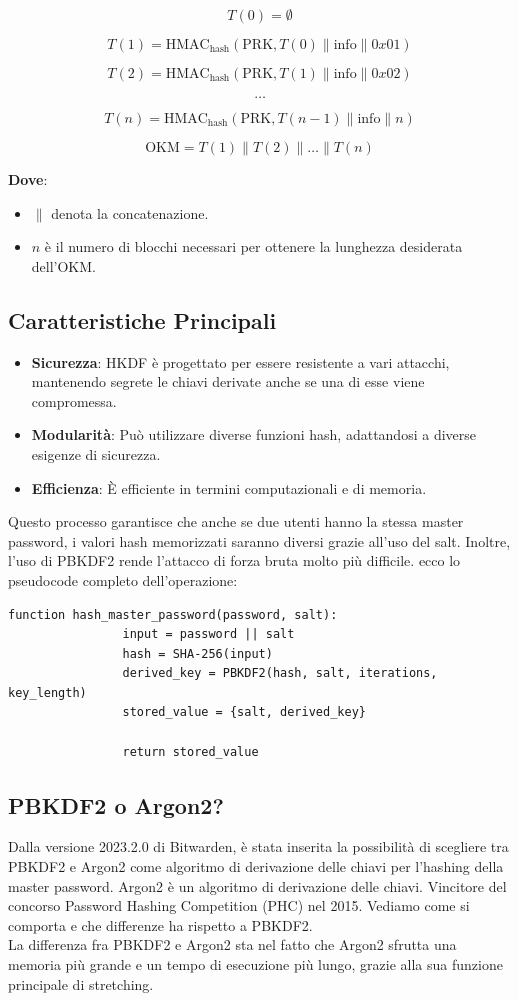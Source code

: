 \documentclass[a4paper,12pt]{report}
\begin{document}
		\[
		T(0) = \emptyset
		\]

		\[
		T(1) = \text{HMAC}_\text{hash}(\text{PRK}, T(0) \| \text{info} \| 0x01)
		\]

		\[
		T(2) = \text{HMAC}_\text{hash}(\text{PRK}, T(1) \| \text{info} \| 0x02)
		\]

		\[
		\ldots
		\]

		\[
		T(n) = \text{HMAC}_\text{hash}(\text{PRK}, T(n-1) \| \text{info} \| n)
		\]

		\[
		\text{OKM} = T(1) \| T(2) \| \ldots \| T(n)
		\]

		\textbf{Dove}:
		\begin{itemize}
			\item \(\| \) denota la concatenazione.
			\item \( n \) è il numero di blocchi necessari per ottenere la
			lunghezza desiderata dell'OKM.
		\end{itemize}

		\subsection*{Caratteristiche Principali}
		\begin{itemize}
			\item \textbf{Sicurezza}: HKDF è progettato per essere resistente a
			vari attacchi, mantenendo segrete le chiavi derivate anche se una di
			esse viene compromessa.
			\item \textbf{Modularità}: Può utilizzare diverse funzioni hash,
			adattandosi a diverse esigenze di sicurezza.
			\item \textbf{Efficienza}: È efficiente in termini computazionali e
			di memoria.
		\end{itemize}

		Questo processo garantisce che anche se due utenti hanno la stessa master password, i valori hash memorizzati saranno diversi grazie all'uso del salt. Inoltre, l'uso di PBKDF2 rende l'attacco di forza bruta molto più difficile.
		ecco lo pseudocode completo dell'operazione:
		\begin{lstlisting}[style=pseudocode]
			function hash_master_password(password, salt):
				input = password || salt
				hash = SHA-256(input)
				derived_key = PBKDF2(hash, salt, iterations, key_length)
				stored_value = {salt, derived_key}
				
				return stored_value
		\end{lstlisting}
		\subsection{PBKDF2 o Argon2?}
		Dalla versione 2023.2.0 di Bitwarden, è stata inserita la possibilità
		di scegliere tra PBKDF2 e Argon2 come algoritmo di derivazione delle
		chiavi per l'hashing della master password. Argon2 è un algoritmo di
		derivazione delle chiavi. Vincitore del concorso Password Hashing
		Competition (PHC) nel 2015. Vediamo come si comporta e che differenze 
		ha rispetto a PBKDF2.\\
		La differenza fra PBKDF2 e Argon2 sta nel fatto che Argon2 sfrutta
		una memoria più grande e un tempo di esecuzione più lungo, grazie alla
		sua funzione principale di stretching. 
\end{document}

